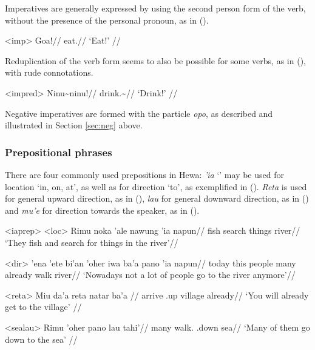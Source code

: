 \documentclass[../hewa_main-subfiles.tex]{subfiles}
\begin{document}
Imperatives are generally expressed by using the second person form of the verb, without the presence of the personal pronoun, as in ().

\ex<imp>
\begingl %
\gla Goa!//
\glb eat.\Second{}\Sg{}//
\glft `Eat!' //
\endgl
\xe

Reduplication of the verb form seems to also be possible for some verbs, as in (), with rude connotations.

\ex<impred>
\begingl %
\gla Ninu\textasciitilde ninu!//
\glb drink.\Second{}\Sg{}\textasciitilde \Rdp{}//
\glft `Drink!' // 
\endgl
\xe

Negative imperatives are formed with the particle \textit{opo}, as described and illustrated in Section \ref{sec:neg} above.

\subsubsection{Prepositional phrases}\label{sec:prep}

There are four commonly used prepositions in Hewa: \textit{'ia} `\Loc{}' may be used for location `in, on, at', as well as for direction `to', as exemplified in (). \textit{Reta} is used for general upward direction, as in (), \textit{lau} for general downward direction, as in () and \textit{mu'e} for direction towards the speaker, as in ().

\pex<iaprep> %
\a<loc> %
\begingl %
\gla Rimu noka 'ale nawung 'ia napun//
\glb \Third{}\Pl{} fish search things \Loc{} river//
\glft `They fish and search for things in the river'//
\endgl

\a<dir> %
\begingl %
\gla 'ena 'ete bi'an 'oher iwa ba'a pano 'ia napun//
\glb today this people many \Neg{} already walk \Dir{} river//
\glft `Nowadays not a lot of people go to the river anymore'// 
\endgl
\xe

\ex<reta> %
\begingl %
\gla Miu da'a reta natar ba'a //
\glb \Second{}\Pl{} arrive \Dir{}.up village already//
\glft `You will already get to the village' // 
\endgl
\xe

\ex<sealau> %
\begingl %
\gla Rimu 'oher pano lau tahi'//
\glb \Third{}\Pl{} many walk.\Third{}\Pl{} \Dir{}.down sea//
\glft `Many of them go down to the sea' // 
\endgl
\xe
\end{document}
